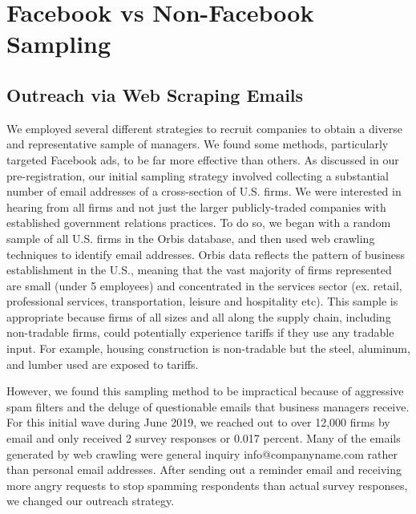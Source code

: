 \recalctypearea

\Large \textbf{} \normalsize
\raggedright


\setcounter{figure}{0}
\renewcommand{\thefigure}{A\arabic{figure}}

\setcounter{table}{0}
\renewcommand{\thetable}{A\arabic{table}}

\setcounter{section}{0}

\section{Facebook vs Non-Facebook Sampling}
\subsection{Outreach via Web Scraping Emails}
We employed several different strategies to recruit companies to obtain a diverse and representative sample of managers. We found some methods, particularly targeted Facebook ads, to be far more effective than others. As discussed in our pre-registration, our initial sampling strategy involved collecting a substantial number of email addresses of a cross-section of U.S. firms. We were interested in hearing from all firms and not just the larger publicly-traded companies with established government relations practices. To do so, we began with a random sample of all U.S. firms in the Orbis database, and then used web crawling techniques to identify email addresses. Orbis data reflects the pattern of business establishment in the U.S., meaning that the vast majority of firms represented are small (under 5 employees) and concentrated in the services sector (ex. retail, professional services, transportation, leisure and hospitality etc). This sample is appropriate because firms of all sizes and all along the supply chain, including non-tradable firms, could potentially experience tariffs if they use any tradable input. For example, housing construction is non-tradable but the steel, aluminum, and lumber used are exposed to tariffs. 

However, we found this sampling method to be impractical because of aggressive spam filters and the deluge of questionable emails that business managers receive. For this initial wave during June 2019, we reached out to over 12,000 firms by email and only received 2 survey responses or 0.017 percent. Many of the emails generated by web crawling were general inquiry info@companyname.com rather than personal email addresses. After sending out a reminder email and receiving more angry requests to stop spamming respondents than actual survey responses, we changed our outreach strategy. 
